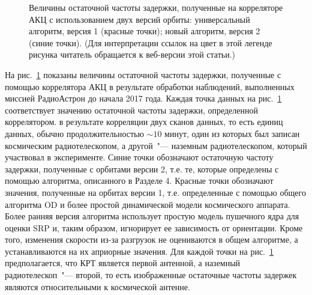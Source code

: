 \begin{figure}
 \caption{Величины остаточной частоты задержки, полученные на корреляторе АКЦ с
использованием двух версий орбиты: универсальный алгоритм, версия 1 (красные точки); новый алгоритм,
версия 2 (синие точки). (Для интерпретации ссылок на цвет в этой легенде рисунка читатель обращается
к веб-версии этой статьи.)}
 \label{fig:rates_v1v2}
\end{figure}

На рис.~\ref{fig:rates_v1v2} показаны величины остаточной частоты задержки, полученные с помощью
коррелятора АКЦ в результате обработки наблюдений, выполненных миссией РадиоАстрон до начала 2017
года. Каждая точка данных на рис.~\ref{fig:rates_v1v2} соответствует значению остаточной частоты
задержки, определенной коррелятором. в результате корреляции двух сканов данных, то есть единиц
данных, обычно продолжительностью $\sim10$ минут, один из которых был записан космическим
радиотелескопом, а другой~"--- наземным радиотелескопом, который участвовал в эксперименте. Синие
точки обозначают остаточную частоту задержки, полученные с орбитами версии 2, т.е. те, которые
определены с помощью алгоритма, описанного в Разделе 4. Красные точки обозначают значения,
полученные на орбитах версии 1, т.е. определенные с помощью общего алгоритма OD и более простой
динамической модели космического аппарата. Более ранняя версия алгоритма использует простую модель
пушечного ядра для оценки SRP и, таким образом, игнорирует ее зависимость от ориентации. Кроме того,
изменения скорости из-за разгрузок не оцениваются в общем алгоритме, а устанавливаются на их
априорные значения. Для каждой точки на рис.~\ref{fig:rates_v1v2} предполагается, что КРТ является
первой антенной, а наземный радиотелескоп~"--- второй, то есть изображенные остаточные частоты
задержек являются относительными к космической антенне.

